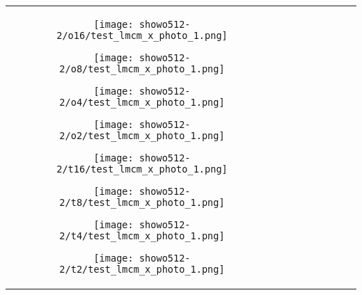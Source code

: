 \begin{figure*}[htbp]
\begin{tabular}{cccccccc}
        \begin{minipage}{0.12\linewidth} 
            \centering
            \texttt{[image: showo512-2/o16/test\_lmcm\_x\_photo\_1.png]}
        \end{minipage} 
        \hspace{-0.15cm} %
        \begin{minipage}{0.12\linewidth} 
            \centering
            \texttt{[image: showo512-2/o8/test\_lmcm\_x\_photo\_1.png]}
        \end{minipage} 
        \hspace{-0.15cm}
        \begin{minipage}{0.12\linewidth} 
            \centering
            \texttt{[image: showo512-2/o4/test\_lmcm\_x\_photo\_1.png]}
        \end{minipage} 
        \hspace{-0.15cm}
        \begin{minipage}{0.12\linewidth} 
            \centering
            \texttt{[image: showo512-2/o2/test\_lmcm\_x\_photo\_1.png]}
        \end{minipage} 
        \hspace{0cm}
        \begin{minipage}{0.12\linewidth} 
            \centering
            \texttt{[image: showo512-2/t16/test\_lmcm\_x\_photo\_1.png]}
        \end{minipage} 
        \hspace{-0.15cm}
        \begin{minipage}{0.12\linewidth} 
            \centering
            \texttt{[image: showo512-2/t8/test\_lmcm\_x\_photo\_1.png]}
        \end{minipage} 
        \hspace{-0.15cm}
        \begin{minipage}{0.12\linewidth} 
            \centering
            \texttt{[image: showo512-2/t4/test\_lmcm\_x\_photo\_1.png]}
        \end{minipage} 
        \hspace{-0.15cm}
        \begin{minipage}{0.12\linewidth} 
            \centering
            \texttt{[image: showo512-2/t2/test\_lmcm\_x\_photo\_1.png]}
        \end{minipage} \\


\end{tabular}
\end{figure*}
